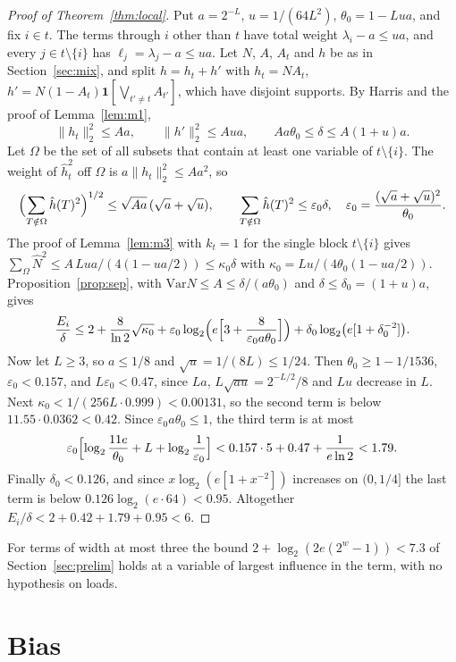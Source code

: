 \documentclass[11pt]{amsart}
\theoremstyle{remark}
\newcommand{\Var}{\mathrm{Var}}
\begin{document}
\begin{proof}[Proof of Theorem~\ref{thm:local}]
Put $a=2^{-L}$, $u=1/(64L^2)$, $\theta_0=1-Lua$, and fix $i\in t$. The terms through $i$ other than $t$ have total
weight $\lambda_i-a\le ua$, and every $j\in t\setminus\{i\}$ has $\ell_j=\lambda_j-a\le ua$. Let $N$, $A$, $A_t$ and
$h$ be as in Section~\ref{sec:mix}, and split $h=h_t+h'$ with $h_t=NA_t$, $h'=N(1-A_t)\mathbf 1[\bigvee_{t'\ne t}A_{t'}]$,
which have disjoint supports. By Harris and the proof of Lemma~\ref{lem:m1},
\[
\|h_t\|_2^2\le Aa,\qquad\|h'\|_2^2\le Aua,\qquad Aa\theta_0\le\delta\le A(1+u)a.
\]
Let $\Omega$ be the set of all subsets that contain at least one variable of $t\setminus\{i\}$. The weight of $\hat h_t^2$
off $\Omega$ is $a\|h_t\|_2^2\le Aa^2$, so
\[
\Bigl(\sum_{T\notin\Omega}\hat h(T)^2\Bigr)^{1/2}\le\sqrt{Aa}\,(\sqrt a+\sqrt u),\qquad
\sum_{T\notin\Omega}\hat h(T)^2\le\varepsilon_0\delta,\quad\varepsilon_0=\frac{(\sqrt a+\sqrt u)^2}{\theta_0}.
\]
The proof of Lemma~\ref{lem:m3} with $k_t=1$ for the single block $t\setminus\{i\}$ gives $\sum_\Omega\hat N^2\le
A\,Lua/(4(1-ua/2))\le\kappa_0\delta$ with $\kappa_0=Lu/(4\theta_0(1-ua/2))$. Proposition~\ref{prop:sep}, with $\Var
N\le A\le\delta/(a\theta_0)$ and $\delta\le \delta_0=(1+u)a$, gives
\[
\frac{E_i}{\delta}\le2+\frac8{\ln2}\sqrt{\kappa_0}+\varepsilon_0\log_2\Bigl(e\Bigl[3+\frac{8}{\varepsilon_0a\theta_0}\Bigr]\Bigr)
+\delta_0\log_2\bigl(e[1+\delta_0^{-2}]\bigr).
\]
Now let $L\ge3$, so $a\le1/8$ and $\sqrt u=1/(8L)\le1/24$. Then $\theta_0\ge1-1/1536$, $\varepsilon_0<0.157$, and
$L\varepsilon_0<0.47$, since $La$, $L\sqrt{au}=2^{-L/2}/8$ and $Lu$ decrease in $L$. Next
$\kappa_0<1/(256L\cdot0.999)<0.00131$, so the second term is below $11.55\cdot0.0362<0.42$. Since
$\varepsilon_0a\theta_0\le1$, the third term is at most
\[
\varepsilon_0\Bigl[\log_2\frac{11e}{\theta_0}+L+\log_2\frac1{\varepsilon_0}\Bigr]<0.157\cdot5+0.47+\frac1{e\ln2}<1.79.
\]
Finally $\delta_0<0.126$, and since $x\log_2(e[1+x^{-2}])$ increases on $(0,1/4]$ the last term is below
$0.126\log_2(e\cdot64)<0.95$. Altogether $E_i/\delta<2+0.42+1.79+0.95<6$.
\end{proof}

For terms of width at most three the bound $2+\log_2(2e(2^w-1))<7.3$ of Section~\ref{sec:prelim} holds at a variable
of largest influence in the term, with no hypothesis on loads.

\section{Bias}\label{sec:bias}
\end{document}
